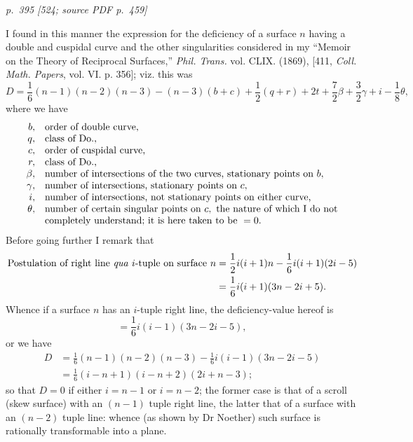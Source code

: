 \documentclass[11pt,a4paper]{article}
\newcommand{\pagemarker}[3]{\par\bigskip\noindent\textit{p.~#1 [#2; source PDF p.~#3]}\par\smallskip}
\begin{document}
\pagemarker{395}{524}{459}

I found in this manner the expression for the deficiency of a surface $n$ having a
double and cuspidal curve and the other singularities considered in my ``Memoir on
the Theory of Reciprocal Surfaces,'' \textit{Phil. Trans.} vol. CLIX. (1869), [411,
\textit{Coll. Math. Papers}, vol. VI. p. 356]; viz. this was
\[
D=\frac16(n-1)(n-2)(n-3)-(n-3)(b+c)+\frac12(q+r)+2t+\frac72\beta+\frac32\gamma+i-\frac18\theta,
\]
where we have
\[
\begin{array}{rl}
b,&\hbox{order of double curve,}\\
q,&\hbox{class of Do.,}\\
c,&\hbox{order of cuspidal curve,}\\
r,&\hbox{class of Do.,}\\
\beta,&\hbox{number of intersections of the two curves, stationary points on }b,\\
\gamma,&\hbox{number of intersections, stationary points on }c,\\
i,&\hbox{number of intersections, not stationary points on either curve,}\\
\theta,&\hbox{number of certain singular points on }c,\hbox{ the nature of which I do not}\\
&\hbox{completely understand; it is here taken to be }=0.
\end{array}
\]
Before going further I remark that
\[
\begin{aligned}
\hbox{Postulation of right line \textit{qua} }i\hbox{-tuple on surface }n
&=\frac12 i(i+1)n-\frac16 i(i+1)(2i-5)\\
&=\frac16 i(i+1)(3n-2i+5).
\end{aligned}
\]
Whence if a surface $n$ has an $i$-tuple right line, the deficiency-value hereof is
\[
=\frac16 i(i-1)(3n-2i-5),
\]
or we have
\[
\begin{aligned}
D&=\frac16(n-1)(n-2)(n-3)-\frac16 i(i-1)(3n-2i-5)\\
&=\frac16(i-n+1)(i-n+2)(2i+n-3);
\end{aligned}
\]
so that $D=0$ if either $i=n-1$ or $i=n-2$; the former case is that of a scroll (skew
surface) with an $(n-1)$ tuple right line, the latter that of a surface with an
$(n-2)$ tuple line: whence (as shown by Dr Noether) such surface is rationally
transformable into a plane.
\end{document}
